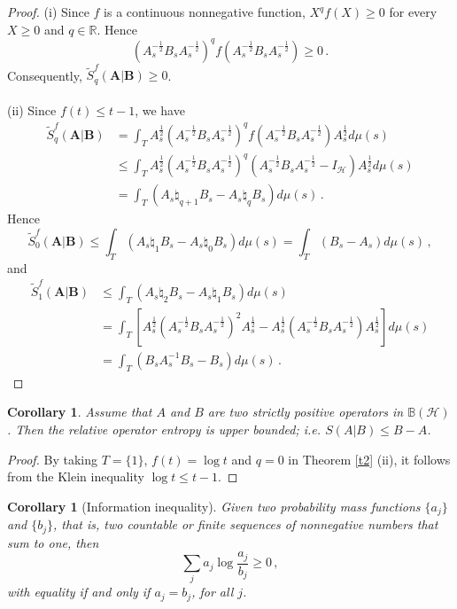 \documentclass[12pt, reqno]{amsart}
\newtheorem{corollary}[theorem]{Corollary}
\theoremstyle{definition}
\theoremstyle{remark}
\numberwithin{equation}{section}
\begin{document}
\begin{proof}
(i) Since $f$ is a continuous nonnegative function, $X^qf(X) \ge 0$ for every $X \ge 0$ and $q\in\mathbb{R}$. Hence
$$
\left(A_s^{-\frac{1}{2}}B_sA_s^{-\frac{1}{2}}\right)^q f\left(A_s^{-\frac{1}{2}}B_sA_s^{-\frac{1}{2}}\right) \ge 0\,.
$$
Consequently, $\widetilde{S}_q^f(\mathbf{A}|\mathbf{B}) \ge 0$.\\
\\
(ii) Since $f(t) \le t-1$, we have
\begin{align*}
\widetilde{S}_q^f(\mathbf{A}|\mathbf{B})&=\int_TA_s^{\frac{1}{2}}\left(A_s^{-\frac{1}{2}}B_sA_s^{-\frac{1}{2}}\right)^q f\left(A_s^{-\frac{1}{2}}B_sA_s^{-\frac{1}{2}}\right)A_s^{\frac{1}{2}}d\mu(s)\\
& \le  \int_TA_s^{\frac{1}{2}}\left(A_s^{-\frac{1}{2}}B_sA_s^{-\frac{1}{2}}\right)^q \left(A_s^{-\frac{1}{2}}B_sA_s^{-\frac{1}{2}}-I_{\mathscr H}\right)A_s^{\frac{1}{2}}d\mu(s)\\
& = \int_T\left(A_s\natural_{q+1} B_s-A_s\natural_q B_s\right)d\mu(s)\,.
\end{align*}
Hence
$$
\widetilde{S}_0^f(\mathbf{A}|\mathbf{B}) \le \int_T\left(A_s\natural_1 B_s-A_s\natural_0 B_s\right)d\mu(s) = \int_T\left(B_s-A_s\right)d\mu(s)\,,
$$
and
\begin{align*}
\widetilde{S}_1^f(\mathbf{A}|\mathbf{B}) & \le \int_T\left(A_s\natural_2 B_s-A_s\natural_1 B_s\right)d\mu(s)\\
&=\int_T\left[A_s^{\frac{1}{2}}\left(A_s^{-\frac{1}{2}}B_sA_s^{-\frac{1}{2}}\right)^2 A_s^{\frac{1}{2}}-A_s^{\frac{1}{2}}\left(A_s^{-\frac{1}{2}}B_sA_s^{-\frac{1}{2}}\right)A_s^{\frac{1}{2}}\right]d\mu(s)\\
&=\int_T\left(B_sA_s^{-1}B_s-B_s\right)d\mu(s)\,.
\end{align*}
\end{proof}
\begin{corollary}\cite[Theorem 5.12]{FMPS}\label{co11}
Assume that $A$ and $B$ are two strictly positive operators in $\mathbb{B}(\mathscr{H})$. Then the relative operator entropy is upper bounded; i.e. $S(A|B) \le B-A$.
\end{corollary}
\begin{proof}
By taking $T=\{1\}$, $f(t)=\log t$ and $q=0$ in Theorem \ref{t2} (ii), it follows from the Klein inequality $\log t \le t-1$.
\end{proof}
\begin{corollary}[Information inequality]\cite[Lemma 3.1]{G}
	Given two probability mass functions $\{a_j\}$ and $\{b_j\}$, that is, two countable or finite sequences of nonnegative numbers that sum to one, then
	\begin{equation}\label{eq111}
    \sum_j a_j\log\frac{a_j}{b_j} \ge 0\,,
	\end{equation}
	with equality if and only if $a_j=b_j$, for all $j$.
\end{corollary}
\end{document}
